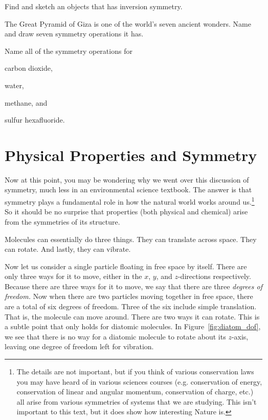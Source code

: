     \begin{exercise}
       Find and sketch an objects that has inversion symmetry.
    \end{exercise}
        
    \begin{exercise}
     The Great Pyramid of Giza is one of the world's seven ancient wonders. Name and draw seven symmetry operations it has.
     \label{ex:giza}
    \end{exercise}

    \begin{exercise}
        Name all of the symmetry operations for
        \begin{enumerate*}[(a)]
            \item carbon dioxide,
            \item water,
            \item methane, and
            \item sulfur hexafluoride.
        \end{enumerate*}
    \end{exercise}


    \section*{Physical Properties and Symmetry} %
    \label{sec:sym_phys_prop}

    Now at this point, you may be wondering why we went over this discussion of symmetry, much less in an environmental science textbook. The answer is that symmetry plays a fundamental role in how the natural world works around us.\footnote{
        The details are not important, but if you think of various conservation laws you may have heard of in various sciences courses (e.g. conservation of energy, conservation of linear and angular momentum, conservation of charge, etc.) all arise from various symmetries of systems that we are studying. This isn't important to this text, but it does show how interesting Nature is.
        } 
    So it should be no surprise that properties (both physical and chemical) arise from the symmetries of its structure. 
    
    Molecules can essentially do three things. They can translate across space. They can rotate. And lastly, they can vibrate.

    Now let us consider a single particle floating in free space by itself. There are only three ways for it to move, either in the $x$, $y$, and $z$-directions respectively. Because there are three ways for it to move, we say that there are three \emph{degrees of freedom.} Now when there are two particles moving together in free space, there are a total of six degrees of freedom. Three of the six include simple translation. That is, the molecule can move around. There are two ways it can rotate. This is a subtle point that only holds for diatomic molecules. In Figure~\ref{fig:diatom_dof}, we see that there is no way for a diatomic molecule to rotate about its $z$-axis, leaving one degree of freedom left for vibration. 

